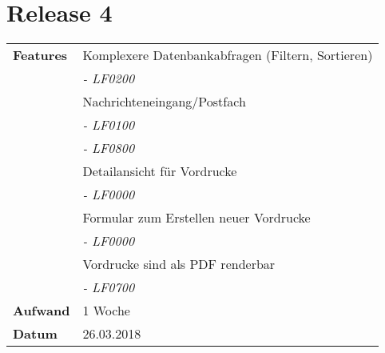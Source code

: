 \section*{Release 4}
\label{sec:release_4}

\begin{tabular}{p{5cm} p{9cm}}
    \textbf{Features} & Komplexere Datenbankabfragen (Filtern, Sortieren) \\
    & \hspace{8pt} \textit{\footnotesize - LF0200} \\
    & Nachrichteneingang/Postfach \\
    & \hspace{8pt} \textit{\footnotesize - LF0100} \\
    & \hspace{8pt} \textit{\footnotesize - LF0800} \\
    & Detailansicht für Vordrucke \\
    & \hspace{8pt} \textit{\footnotesize - LF0000} \\
    & Formular zum Erstellen neuer Vordrucke \\
    & \hspace{8pt} \textit{\footnotesize - LF0000} \\
    & Vordrucke sind als PDF renderbar \\
    & \hspace{8pt} \textit{\footnotesize - LF0700} \\
    \hline
    \textbf{Aufwand} & 1 Woche \\
    \hline
    \textbf{Datum} & 26.03.2018
\end{tabular}
